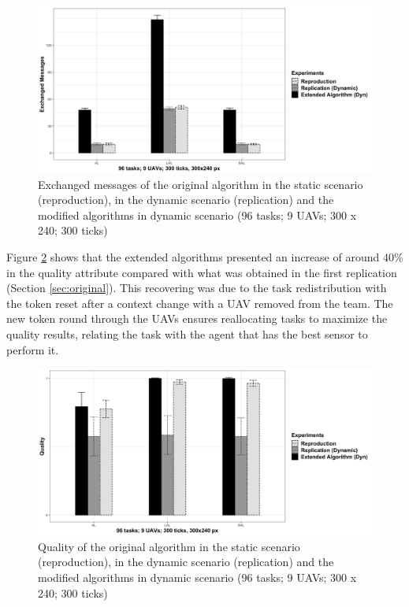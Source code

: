 \begin{figure}[h!]
	\begin{center}
		\includegraphics[scale=0.15]{fig/GRAPH06.png}
		\caption{Exchanged messages  of the original algorithm in the static scenario (reproduction), in the dynamic scenario (replication) and the modified algorithms in dynamic scenario (96 tasks; 9 UAVs; 300 x 240; 300 ticks)}
		\label{fig:fig06}
	\end{center}
\end{figure}



Figure \ref{fig:fig05} shows that the extended algorithms presented an increase of around 40\% in the quality attribute compared with what was obtained in the first replication (Section \ref{sec:original}). This recovering was due to the task redistribution with the token reset after a context change with a UAV removed from the team. The new token round through the UAVs ensures reallocating tasks to maximize the quality results, relating the task with the agent that has the best sensor to perform it.

\begin{figure}[h!]
	\begin{center}
		\includegraphics[scale=0.15]{fig/GRAPH07.png}
		\caption{Quality of the original algorithm in the static scenario (reproduction), in the dynamic scenario (replication) and the modified algorithms in dynamic scenario (96 tasks; 9 UAVs; 300 x 240; 300 ticks)}
		\label{fig:fig05}
	\end{center}
\end{figure}

